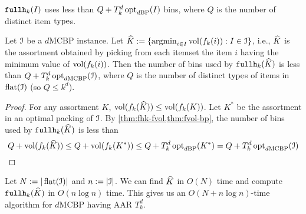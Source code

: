 \begin{lemma}
\label{thm:fhk-appx}
$\operatorname{\mathtt{fullh}}_k(I)$ uses less than $Q + T_k^d\operatorname{opt}_{d\mathrm{BP}}(I)$ bins,
where $Q$ is the number of distinct item $\operatorname{type}$s.
\end{lemma}

\begin{theorem}
Let $\mathcal{I}$ be a $d$MCBP instance.
Let $\widehat{K} := \{\operatorname*{argmin}_{i \in I} \operatorname{vol}(f_k(i)): I \in \mathcal{I}\}$,
i.e., $\widehat{K}$ is the assortment obtained by picking from each itemset
the item $i$ having the minimum value of $\operatorname{vol}(f_k(i))$.
Then the number of bins used by $\operatorname{\mathtt{fullh}}_k(\widehat{K})$ is less than $Q + T_k^d\operatorname{opt}_{d\mathrm{MCBP}}(\mathcal{I})$,
where $Q$ is the number of distinct $\operatorname{type}$s of items in $\operatorname{flat}(\mathcal{I})$ (so $Q \le k^d$).
\end{theorem}
\begin{proof}
For any assortment $K$, $\operatorname{vol}(f_k(\widehat{K})) \le \operatorname{vol}(f_k(K))$.
Let $K^*$ be the assortment in an optimal packing of $\mathcal{I}$.
By \cref{thm:fhk-fvol,thm:fvol-bp}, the number of bins used by
$\operatorname{\mathtt{fullh}}_k(\widehat{K})$ is less than
\[ Q + \operatorname{vol}(f_k(\widehat{K}))
\le Q + \operatorname{vol}(f_k(K^*))
\le Q + T_k^d\operatorname{opt}_{d\mathrm{BP}}(K^*)
= Q + T_k^d\operatorname{opt}_{d\mathrm{MCBP}}(\mathcal{I}) \qedhere \]
\end{proof}

Let $N := |\operatorname{flat}(\mathcal{I})|$ and $n := |\mathcal{I}|$.
We can find $\widehat{K}$ in $O(N)$ time and compute $\operatorname{\mathtt{fullh}}_k(\widehat{K})$ in $O(n\log n)$ time.
This gives us an $O(N + n\log n)$-time algorithm for $d$MCBP having AAR $T_k^d$.
